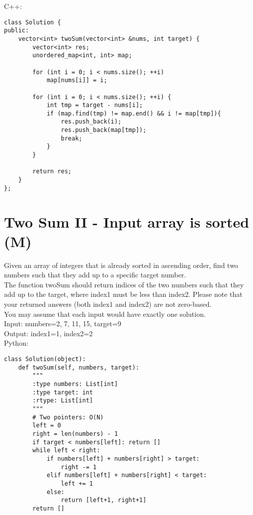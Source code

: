 C++:
\lstset{language=C++}
\begin{lstlisting}
class Solution {
public:
    vector<int> twoSum(vector<int> &nums, int target) {
        vector<int> res;
        unordered_map<int, int> map;
        
        for (int i = 0; i < nums.size(); ++i)
            map[nums[i]] = i;
            
        for (int i = 0; i < nums.size(); ++i) {
            int tmp = target - nums[i];
            if (map.find(tmp) != map.end() && i != map[tmp]){
                res.push_back(i);
                res.push_back(map[tmp]);
                break;
            }
        }
        
        return res;
    }
};
\end{lstlisting}


\section{Two Sum II - Input array is sorted (M)}
Given an array of integers that is already sorted in ascending order, find two numbers such that they add up to a specific target number.\\

The function twoSum should return indices of the two numbers such that they add up to the target, where index1 must be less than index2. Please note that your returned answers (both index1 and index2) are not zero-based.\\

You may assume that each input would have exactly one solution.\\

Input: numbers={2, 7, 11, 15}, target=9\\
Output: index1=1, index2=2\\

Python:
\lstset{language=python}
\begin{lstlisting}
class Solution(object):
    def twoSum(self, numbers, target):
        """
        :type numbers: List[int]
        :type target: int
        :rtype: List[int]
        """
        # Two pointers: O(N)
        left = 0
        right = len(numbers) - 1
        if target < numbers[left]: return []
        while left < right:
            if numbers[left] + numbers[right] > target:
                right -= 1
            elif numbers[left] + numbers[right] < target:
                left += 1
            else:
                return [left+1, right+1]
        return []
   \end{lstlisting}         

